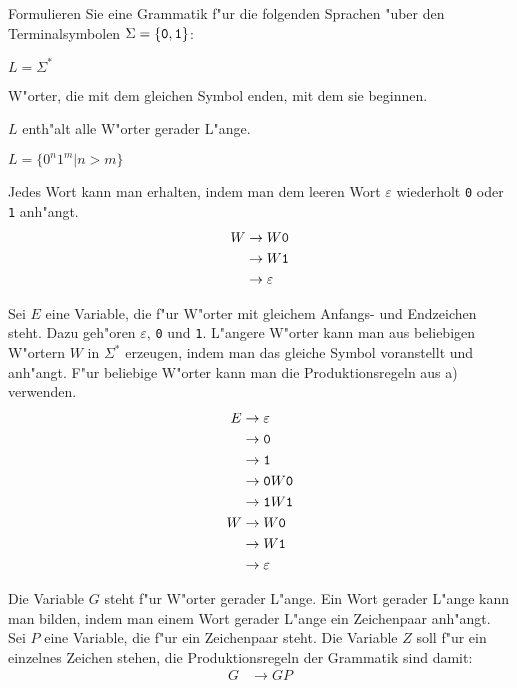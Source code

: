 Formulieren Sie eine Grammatik f"ur die folgenden Sprachen "uber
den Terminalsymbolen $\Sigma=\{{\tt 0},{\tt 1}\}$:
\begin{teilaufgaben}
\item $L=\Sigma^*$
\item W"orter, die mit dem gleichen Symbol enden, mit dem sie beginnen.
\item $L$ enth"alt alle W"orter gerader L"ange.
\item $L=\{0^n1^m|n>m\}$
\end{teilaufgaben}

\begin{loesung}
\begin{teilaufgaben}
\item
Jedes Wort kann man erhalten, indem man dem leeren Wort $\varepsilon$
wiederholt {\tt 0} oder {\tt 1} anh"angt.
\begin{align*}
W&\rightarrow W{\tt 0}\\
 &\rightarrow W{\tt 1}\\
 &\rightarrow\varepsilon
\end{align*}
\item Sei $E$ eine Variable, die f"ur W"orter mit gleichem Anfangs-
und Endzeichen steht. Dazu geh"oren $\varepsilon$, {\tt 0} und {\tt 1}.
L"angere
W"orter kann man aus beliebigen W"ortern $W$ in $\Sigma^*$ erzeugen,
indem man das gleiche Symbol voranstellt und anh"angt. F"ur beliebige
W"orter kann
man die Produktionsregeln aus a) verwenden.
\begin{align*}
E&\rightarrow \varepsilon\\
 &\rightarrow {\tt 0}\\
 &\rightarrow {\tt 1}\\
 &\rightarrow {\tt 0}W{\tt 0}\\
 &\rightarrow {\tt 1}W{\tt 1}\\
W&\rightarrow W{\tt 0}\\
 &\rightarrow W{\tt 1}\\
 &\rightarrow\varepsilon
\end{align*}
\item Die Variable $G$ steht f"ur W"orter gerader L"ange. Ein Wort
gerader L"ange kann man bilden, indem man einem Wort gerader L"ange
ein Zeichenpaar anh"angt. Sei $P$ eine Variable, die f"ur ein Zeichenpaar
steht. Die Variable $Z$ soll f"ur ein einzelnes Zeichen stehen, die
Produktionsregeln der Grammatik sind damit:
\begin{align*}
G&\rightarrow GP\\

\end{align*}
\end{teilaufgaben}
\end{loesung}
